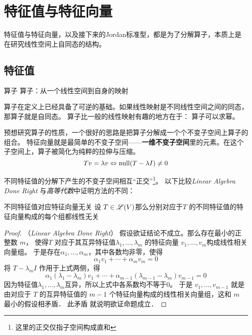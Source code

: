 \chapter{特征值与特征向量}
特征值与特征向量，以及接下来的Jordan标准型，都是为了分解算子，本质上是在研究线性空间上自同态的结构。

\section{特征值}
\begin{definition}{算子}
    算子：从一个线性空间到自身的映射
\end{definition}

算子在定义上已经具备了可逆的基础。如果线性映射是不同线性空间之间的同态，那算子就是自同态。
算子比一般的线性映射有趣的地方在于： 算子可以求幂。

预想研究算子的性质，一个很好的思路是把算子分解成一个个不变子空间上算子的组合。
特征向量就是最简单的不变子空间——\textbf{一维不变子空间}里的元素。在这个子空间上，算子被简化为纯粹的拉伸与压缩。
\[
    Tv=\lambda v \Leftrightarrow \operatorname{null}(T-\lambda I)\neq {0}
\]

不同特征值的分解下产生的不变子空间相互``正交''\footnote{这里的正交仅指子空间构成直和}。
以下比较\textit{Linear Algebra Done Right} 与\textit{高等代数}中证明方法的不同：

\begin{theorem}{不同特征值对应特征向量无关}
    设 \(T \in \mathscr{L}(V)\)那么分别对应于\(T\) 的不同特征值的特征向量构成的每个组都线性无关
\end{theorem}

\begin{proof}
    （\textit{Linear Algebra Done Right}）
    假设欲证结论不成立。那么存在最小的正整数 \(m\)， 使得\(T\)
    对应于其互异特征值\(\lambda_1, \dots ,\lambda_{m}\)
    的特征向量 \(v_1, \dots, v_m\)构成线性相关向量组。
    于是存在\(\alpha_1, \dots ,\alpha_{m}\)，其中各数均非零，使得
    \[\alpha_1 v_1 + \cdots + \alpha_m v_m = 0\]
    将 \(T-\lambda_{m}I\) 作用于上式两侧，得
    \[
        \alpha_1 (\lambda_1 - \lambda_m)v_1 + \cdots +
        \alpha_{m-1} (\lambda_{m-1} - \lambda_m)v_{m-1} = 0
    \]
    因为特征值\(\lambda_1,\dots ,\lambda_{m}\)互异，所以上式中各系数均不等于0。
    于是 \(v_1, \dots , v_{m-1}\) 就是由对应于 \(T\)
    的互异特征值的 \(m- 1\) 个特征向量构成的线性相关向量组，这和 \(m\) 最小的假设相矛盾． 此矛盾
    就说明欲证命题成立．
\end{proof}

